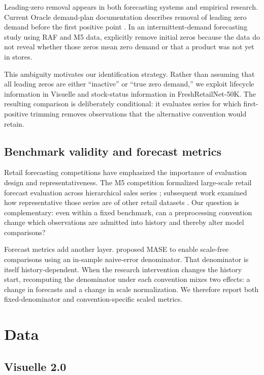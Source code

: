 Leading-zero removal appears in both forecasting systems and empirical research. Current Oracle demand-plan documentation describes removal of leading zero demand before the first positive point \citep{oracle2026leadingzeros}. In an intermittent-demand forecasting study using RAF and M5 data, \citet{li2023feature} explicitly remove initial zeros because the data do not reveal whether those zeros mean zero demand or that a product was not yet in stores.

This ambiguity motivates our identification strategy. Rather than assuming that all leading zeros are either ``inactive'' or ``true zero demand,'' we exploit lifecycle information in Visuelle and stock-status information in FreshRetailNet-50K. The resulting comparison is deliberately conditional: it evaluates series for which first-positive trimming removes observations that the alternative convention would retain.

\subsection{Benchmark validity and forecast metrics}

Retail forecasting competitions have emphasized the importance of evaluation design and representativeness. The M5 competition formalized large-scale retail forecast evaluation across hierarchical sales series \citep{makridakis2022m5}; subsequent work examined how representative those series are of other retail datasets \citep{theodorou2022representativeness}. Our question is complementary: even within a fixed benchmark, can a preprocessing convention change which observations are admitted into history and thereby alter model comparisons?

Forecast metrics add another layer. \citet{hyndman2006mase} proposed MASE to enable scale-free comparisons using an in-sample naive-error denominator. That denominator is itself history-dependent. When the research intervention changes the history start, recomputing the denominator under each convention mixes two effects: a change in forecasts and a change in scale normalization. We therefore report both fixed-denominator and convention-specific scaled metrics.

\section{Data}

\subsection{Visuelle 2.0}

